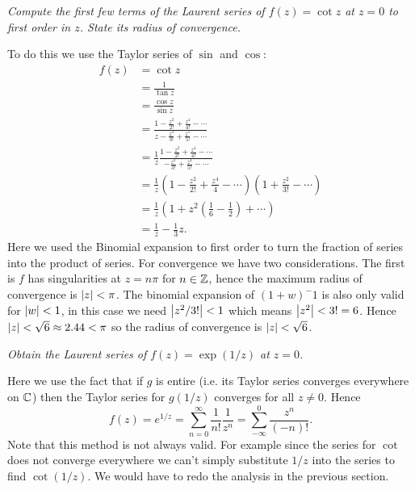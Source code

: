 \documentclass{article}
\begin{document}
    \begin{example}
        \emph{Compute the first few terms of the Laurent series of \(f(z) = \cot z\) at \(z = 0\) to first order in \(z\). State its radius of convergence.}
        
        To do this we use the Taylor series of \(\sin\) and \(\cos\):
        \begin{align*}
            f(z) &= \cot z\\
            &= \frac{1}{\tan z}\\
            &= \frac{\cos z}{\sin z}\\
            &= \frac{1 - \frac{z^2}{2!} + \frac{z^4}{4!} - \dotsb}{z - \frac{z^3}{3!} + \frac{z^5}{5!} - \dotsb}\\
            &= \frac{1}{z}\frac{1 - \frac{z^2}{2!} + \frac{z^4}{4!} - \dotsb}{ - \frac{z^2}{3!} + \frac{z^4}{5!} - \dotsb}\\
            &= \frac{1}{z} \left( 1 - \frac{z^2}{2!} + \frac{z^4}{4} - \dotsb \right) \left( 1 + \frac{z^2}{3!} - \dotsb \right)\\
            &= \frac{1}{z} \left( 1 + z^2\left( \frac{1}{6} - \frac{1}{2} \right) + \dotsb \right)\\
            &= \frac{1}{z} - \frac{1}{3}z.
        \end{align*}
        Here we used the Binomial expansion to first order to turn the fraction of series into the product of series.
        For convergence we have two considerations.
        The first is \(f\) has singularities at \(z = n\pi\) for \(n\in\mathbb{Z}\), hence the maximum radius of convergence is \(\abs{z} < \pi\).
        The binomial expansion of \((1 + w)^-1\) is also only valid for \(\abs{w} < 1\), in this case we need \(\abs{z^2/3!} < 1\) which means \(\abs{z^2} < 3! = 6\).
        Hence \(\abs{z} < \sqrt{6} \approx 2.44 < \pi\) so the radius of convergence is \(\abs{z} < \sqrt{6}\).
    \end{example}
    \begin{example}
        \emph{Obtain the Laurent series of \(f(z) = \exp(1/z)\) at \(z = 0\).}
        
        Here we use the fact that if \(g\) is entire (i.e. its Taylor series converges everywhere on \(\mathbb{C}\)) then the Taylor series for \(g(1/z)\) converges for all \(z \ne 0\).
        Hence
        \[f(z) = e^{1/z} = \sum_{n=0}^{\infty}\frac{1}{n!}\frac{1}{z^n} = \sum_{-\infty}^{0} \frac{z^n}{(-n)!}.\]
        Note that this method is not always valid.
        For example since the series for \(\cot\) does not converge everywhere we can't simply substitute \(1/z\) into the series to find \(\cot(1/z)\).
        We would have to redo the analysis in the previous section.
    \end{example}
\end{document}
